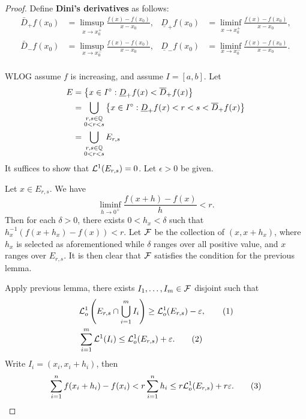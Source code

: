 \documentclass[a4paper]{article}
\begin{document}
\begin{proof}
  Define \textbf{Dini's derivatives} as follows:
  \begin{align*}
    \bar{D}_+ f(x_0)       & = \limsup_{x \to x_0^+} \frac{f(x) - f(x_0)}{x - x_0}, &
    \underline{D}_+ f(x_0) & = \liminf_{x \to x_0^+} \frac{f(x) - f(x_0)}{x - x_0},   \\
    \bar{D}_- f(x_0)       & = \limsup_{x \to x_0^-} \frac{f(x) - f(x_0)}{x - x_0}, &
    \underline{D}_- f(x_0) & = \liminf_{x \to x_0^-} \frac{f(x) - f(x_0)}{x - x_0}.   \\
  \end{align*}

  WLOG assume $f$ is increasing, and assume $I = [a, b]$. Let
  \begin{align*}
    E & = \left\{ x \in I^\circ : \underline{D}_+ f(x) < \overline{D}_+ f(x) \right\}   \\
      & = \bigcup_{\substack{r, s \in \mathbb{Q} \\ 0 < r < s}}
    \left\{ x \in I^\circ : \underline{D}_+ f(x) < r < s < \overline{D}_+ f(x) \right\} \\
      & = \bigcup_{\substack{r, s \in \mathbb{Q} \\ 0 < r < s}} E_{r, s}
  \end{align*}
  It suffices to show that $\mathcal{L}^1 (E_{r, s}) = 0$. Let $\epsilon > 0$ be given.

  Let $x \in E_{r, s}$. We have
  \[
    \liminf_{h \to 0^+} \frac{f(x + h) - f(x)}{h} < r.
  \]
  Then for each $\delta > 0$, there exists $0 < h_x < \delta$ such that
  $h_x^{-1} (f(x + h_x) - f(x)) < r$. Let $\mathcal{F}$ be the collection of
  $(x, x + h_x)$, where $h_x$ is selected as aforementioned while $\delta$
  ranges over all positive value, and $x$ ranges over $E_{r, s}$. It is
  then clear that $\mathcal{F}$ satisfies the condition for the previous lemma.

  Apply previous lemma, there exists $I_1, \dots, I_m \in \mathcal{F}$ disjoint
  such that
  \begin{align*}
     & \mathcal{L}_o^1 \left( E_{r, s} \cap \bigcup_{i=1}^m I_i \right) \geq \mathcal{L}_o^1 (E_{r, s}) - \varepsilon, \tag{1} \\
     & \sum_{i=1}^m \mathcal{L}^1 (I_i) \leq \mathcal{L}_o^1 (E_{r,s}) + \varepsilon. \tag{2}
  \end{align*}
  Write $I_i = (x_i, x_i + h_i)$, then
  \begin{align*}
    \sum_{i=1}^n f(x_i + h_i) - f(x_i)
    < r \sum_{i=1}^n h_i
    \leq r \mathcal{L}_o^1 (E_{r,s}) + r \varepsilon. \tag{3}
  \end{align*}


\end{proof}
\end{document}
